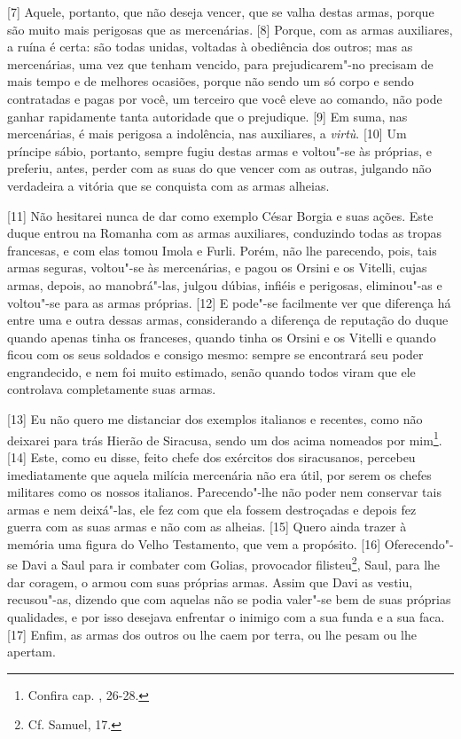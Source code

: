 {[}7{]} Aquele, portanto, que não deseja vencer, que se valha destas
armas, porque são muito mais perigosas que as mercenárias. {[}8{]}
Porque, com as armas auxiliares, a ruína é certa: são todas unidas,
voltadas à obediência dos outros; mas as mercenárias, uma vez que tenham
vencido, para prejudicarem"-no precisam de mais tempo e de melhores
ocasiões, porque não sendo um só corpo e sendo contratadas e pagas por
você, um terceiro que você eleve ao comando, não pode ganhar rapidamente
tanta autoridade que o prejudique. {[}9{]} Em suma, nas mercenárias, é
mais perigosa a indolência, nas auxiliares, a \emph{virtù}. {[}10{]} Um
príncipe sábio, portanto, sempre fugiu destas armas e voltou"-se às
próprias, e preferiu, antes, perder com as suas do que vencer com as
outras, julgando não verdadeira a vitória que se conquista com as armas
alheias.

{[}11{]} Não hesitarei nunca de dar como exemplo César Borgia e suas
ações. Este duque entrou na Romanha com as armas auxiliares, conduzindo
todas as tropas francesas, e com elas tomou Imola e Furli. Porém, não
lhe parecendo, pois, tais armas seguras, voltou"-se às mercenárias, e
pagou os Orsini e os Vitelli, cujas armas, depois, ao manobrá"-las,
julgou dúbias, infiéis e perigosas, eliminou"-as e voltou"-se para as
armas próprias. {[}12{]} E pode"-se facilmente ver que diferença há entre
uma e outra dessas armas, considerando a diferença de reputação do duque
quando apenas tinha os franceses, quando tinha os Orsini e os Vitelli e
quando ficou com os seus soldados e consigo mesmo: sempre se encontrará
seu poder engrandecido, e nem foi muito estimado, senão quando todos
viram que ele controlava completamente suas armas.

{[}13{]} Eu não quero me distanciar dos exemplos italianos e recentes,
como não deixarei para trás Hierão de Siracusa, sendo um dos acima
nomeados por mim\footnote{Confira cap. , 26-28.}. {[}14{]} Este, como
eu disse, feito chefe dos exércitos dos siracusanos, percebeu
imediatamente que aquela milícia mercenária não era útil, por serem os
chefes militares como os nossos italianos. Parecendo"-lhe não poder nem
conservar tais armas e nem deixá"-las, ele fez com que ela fossem
destroçadas e depois fez guerra com as suas armas e não com as alheias.
{[}15{]} Quero ainda trazer à memória uma figura do Velho Testamento,
que vem a propósito. {[}16{]} Oferecendo"-se Davi a Saul para ir combater
com Golias, provocador filisteu\footnote{Cf.  Samuel, 17.}, Saul, para
lhe dar coragem, o armou com suas próprias armas. Assim que Davi as
vestiu, recusou"-as, dizendo que com aquelas não se podia valer"-se bem de
suas próprias qualidades, e por isso desejava enfrentar o inimigo com a
sua funda e a sua faca. {[}17{]} Enfim, as armas dos outros ou lhe caem
por terra, ou lhe pesam ou lhe apertam.

